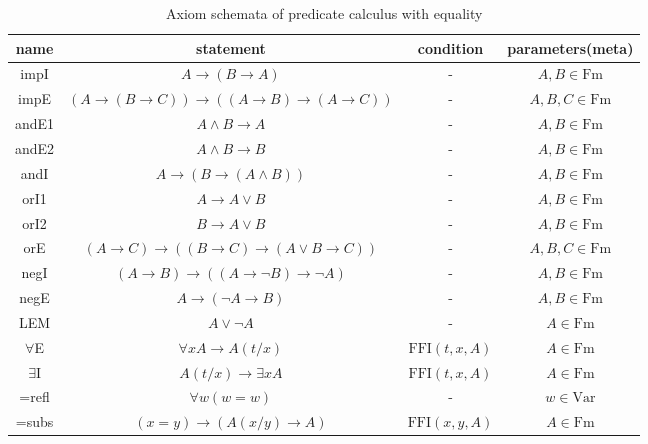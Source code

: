 \documentclass[10pt,a4paper]{article}
\begin{document}
\begin{table}[H]
\centering
\setlength{\tabcolsep}{4.5pt}
\caption{Axiom schemata of predicate calculus with equality}
\label{tab:axiompltab}
\begin{tabular}{|c|c|c|c|}
\hline
name & statement & condition & parameters(meta)\\ \hline
\hline
impI & $A \to (B \to A)$ & - & $A,B \in \textrm{Fm}$\\ %
impE & $(A \to (B \to C))\to((A\to B)\to(A\to C))$ & -& $A,B,C \in \textrm{Fm}$\\ \hline
\hline
andE1 & $A \land B \to A$& -& $A,B \in \textrm{Fm}$\\ %
andE2 & $A \land B \to B$& -& $A,B \in \textrm{Fm}$\\ %
andI & $A\to(B\to (A \land B))$& -& $A,B \in \textrm{Fm}$\\ \hline
\hline
orI1 & $A \to  A \lor B$& -& $A,B \in \textrm{Fm}$\\ %
orI2 & $B \to  A \lor B$& -& $A,B \in \textrm{Fm}$\\ %
orE & $(A \to  C)\to ((B \to  C) \to  (A \lor B \to  C))$& -& $A,B,C \in \textrm{Fm}$\\ \hline
\hline
negI & $(A \to  B) \to  ((A \to  \neg B) \to  \neg A)$& -& $A,B \in \textrm{Fm}$\\ %
negE & $A \to  (\neg A \to  B)$& -& $A,B \in \textrm{Fm}$\\ \hline
\hline
LEM & $A \lor \neg A$& -& $A \in \textrm{Fm}$\\ \hline
\hline
$\forall$E & $\forall xA\to A(t/x)$ & $\textrm{FFI}(t,x,A)$& $A \in \textrm{Fm}$\\ %
$\exists$I & $A(t/x)\to \exists x A$ & $\textrm{FFI}(t,x,A)$& $A \in \textrm{Fm}$\\ \hline
\hline
=refl&$\forall w (w=w)$&-& $w \in \textrm{Var}$\\
=subs&$(x=y)\to ( A(x/y)\to A) $&$\textrm{FFI}(x,y,A)$& $A \in \textrm{Fm}$\\\hline
\end{tabular}
\end{table}
\end{document}

